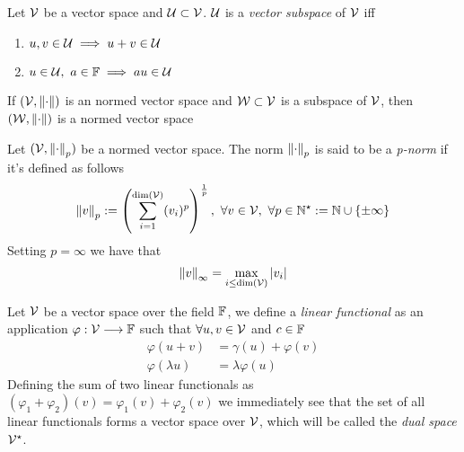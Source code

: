 \documentclass[../complete.tex]{subfiles}
\begin{document}
\begin{dfn}
	Let $\mathcal{V}$ be a vector space and $\operatorname{\mathcal{U}}\subset\mathcal{V}$. $\operatorname{\mathcal{U}}$ is a \textit{vector subspace} of $\mathcal{V}$ iff
	\begin{enumerate}
	\item $u,v\in\operatorname{\mathcal{U}}\implies u+v\in\operatorname{\mathcal{U}}$
	\item $u\in\operatorname{\mathcal{U}},\ a\in\mathbb{F}\implies au\in\operatorname{\mathcal{U}}$
	\end{enumerate}
\end{dfn}
\begin{prop}
	If $(\mathcal{V},\norm{\cdot})$ is an normed vector space and $\mathcal{W}\subset\mathcal{V}$ is a subspace of $\mathcal{V}$, then $(\mathcal{W},\norm{\cdot})$ is a normed vector space
\end{prop}
\begin{dfn}[p-norm]
	Let $(\mathcal{V},\norm{\cdot}_p)$ be a normed vector space. The norm $\norm{\cdot}_p$ is said to be a \textit{p-norm} if it's defined as follows
	\begin{equation}
		\norm{v}_p:=\left( \sum_{i=1}^{\dim(\mathcal{V})}(v_i)^p \right)^{\frac{1}{p}},\ \forall v\in\mathcal{V},\ \forall p\in\mathbb{N}^{\star}:=\mathbb{N}\cup\{\pm\infty\}
		\label{eq:pnorm}
	\end{equation}
	Setting $p=\infty$ we have that
	\begin{equation}
		\norm{v}_{\infty}=\max_{i\le\dim(\mathcal{V})}\abs{v_i}
		\label{eq:inftynorm}
	\end{equation}
\end{dfn}
\begin{dfn}
	Let $\mathcal{V}$ be a vector space over the field $\mathbb{F}$, we define a \textit{linear functional} as an application $\varphi:\mathcal{V}\overset{}{\longrightarrow}\mathbb{F}$ such that $\forall u,v\in\mathcal{V}$ and $c\in\mathbb{F}$
	\begin{equation}
		\begin{aligned}
			\varphi(u+v)&=\gamma(u)+\varphi(v)\\
			\varphi(\lambda u)&=\lambda\varphi(u)
		\end{aligned}
		\label{eq:linearfunctional}
	\end{equation}
	Defining the sum of two linear functionals as $(\varphi_1+\varphi_2)(v)=\varphi_1(v)+\varphi_2(v)$ we immediately see that the set of all linear functionals forms a vector space over $\mathcal{V}$, which will be called the \textit{dual space} $\mathcal{V}^\star$.
\end{dfn}
\end{document}
